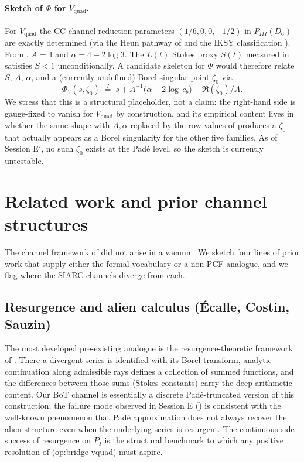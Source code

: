 \documentclass[11pt,reqno]{amsart}
\theoremstyle{plain}
\theoremstyle{definition}
\theoremstyle{remark}
\newcommand{\Lt}{L(t)}
\newcommand{\BoT}{\mathrm{BoT}}
\newcommand{\CC}{\mathrm{CC}}
\newcommand{\Vquad}{V_{\mathrm{quad}}}
\begin{document}
\paragraph{Sketch of $\Phi$ for $\Vquad$.}
For $\Vquad$ the $\CC$-channel reduction parameters
$(1/6, 0, 0, -1/2)$ in $P_{III}(D_6)$ are exactly determined
(via the Heun pathway of \cite{slavyanov2000special} and the
IKSY classification \cite{iwasaki1991from, ohyama2006studies}).
From , $A = 4$ and
$\alpha = 4 - 2 \log 3$. The $\Lt$ Stokes proxy $S(t)$
measured in \cite{siarc_pcf1_v13} satisfies $S < 1$
unconditionally. A candidate skeleton for $\Phi$ would
therefore relate $S$, $A$, $\alpha$, and a (currently
undefined) Borel singular point $\zeta_0$ via
\[
  \Phi_{V} (s, \zeta_0) \;\stackrel{?}{=}\;
  s + A^{-1}\bigl(\alpha - 2\log\,c_b\bigr)
  - \Re(\zeta_0)/A.
\]
We stress that this is a structural placeholder, not a
claim: the right-hand side is gauge-fixed to vanish for
$\Vquad$ by construction, and its empirical content lives
in whether the same shape with $A, \alpha$ replaced by the
row values of  produces a $\zeta_0$ that
actually appears as a Borel singularity for the other five
families. As of Session E$'$, no such $\zeta_0$ exists at
the Pad\'e level, so the sketch is currently untestable.

\section{Related work and prior channel structures}
\label{sec:related}

The channel framework of  did not arise in
a vacuum. We sketch four lines of prior work that supply
either the formal vocabulary or a non-PCF analogue, and we
flag where the SIARC channels diverge from each.

\subsection{Resurgence and alien calculus
(\'Ecalle, Costin, Sauzin)}
The most developed pre-existing analogue is the
resurgence-theoretic framework of
\cite{ecalle1981fonctions, costin2008asymptotics,
sauzin2014resurgent, mitschi2016divergent}. There a
divergent series is identified with its Borel transform,
analytic continuation along admissible rays defines a
collection of summed functions, and the differences between
those sums (Stokes constants) carry the deep arithmetic
content. Our $\BoT$ channel is essentially a discrete
Pad\'e-truncated version of this construction; the failure
mode observed in Session E
(\cite{siarc_borel_5x}) is consistent with the well-known
phenomenon that Pad\'e approximation does not always recover
the alien structure even when the underlying series is
resurgent. The continuous-side success of resurgence
\cite{delabaere2016divergent} on $P_I$ is the structural
benchmark to which any positive resolution of
\textsf{(op:bridge-vquad)} must aspire.
\end{document}
